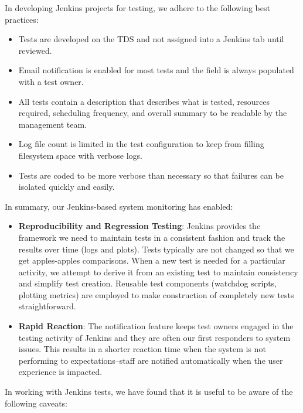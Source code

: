 \documentclass[10pt, conference, compsocconf]{IEEEtran}
\begin{document}
In developing Jenkins projects for testing, we adhere to the following best practices: 
\begin{itemize}
\item Tests are developed on the TDS and not assigned into a Jenkins tab until reviewed. 
\item Email notification is enabled for most tests and the field is always populated with a test owner.
\item All tests contain a description that describes what is tested, resources required, scheduling frequency, and overall summary  to be readable by the management team.
\item Log file count is limited in the test configuration to keep from filling filesystem space with verbose logs.
\item Tests are coded to be more verbose than necessary so that failures can be isolated quickly and easily.
\end{itemize}

In summary, our Jenkins-based system monitoring has enabled: 

\begin{itemize}
 
\item \textbf{Reproducibility and Regression Testing}: Jenkins provides the framework we need to maintain tests in a consistent fashion and track the results over time (logs and plots). 
Tests typically are not changed so that we get apples-apples comparisons.
When a new test is needed for a particular activity, we attempt to derive it from an existing test to maintain consistency and simplify test creation.
Reusable test components (watchdog scripts, plotting metrics) are employed to make construction of completely new tests straightforward.

\item \textbf{Rapid Reaction}:
The notification feature keeps test owners engaged in the testing activity of Jenkins and they are often our first responders to system issues.  This results in a shorter reaction time when the system is not performing to expectations--staff are notified automatically when the user experience is impacted.

\end{itemize}

In working with Jenkins tests, we have found that it is useful to be aware of the following caveats: 
\end{document}
